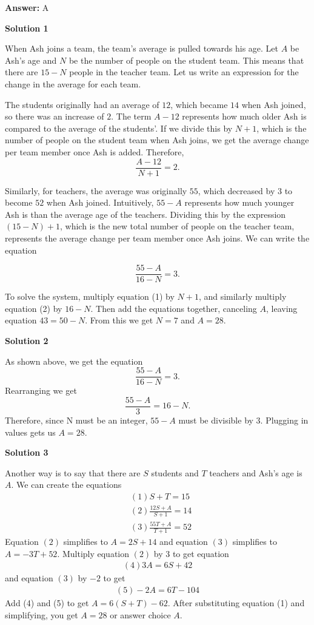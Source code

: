 \begin{enumerate}
 \textbf{Answer: }A



\textbf{Solution 1}

When Ash joins a team, the team's average is pulled towards his age. Let $A$ be Ash's age and $N$ be the number of people on the student team. This means that there are $15-N$ people in the teacher team. Let us write an expression for the change in the average for each team.

 The students originally had an average of $12$, which became $14$ when Ash joined, so there was an increase of $2$. The term $A-12$ represents how much older Ash is compared to the average of the students'. If we divide this by $N+1$, which is the number of people on the student team when Ash joins, we get the average change per team member once Ash is added. Therefore, 
 \[\frac{A-12}{N+1} = 2.\]

 Similarly, for teachers, the average was originally $55$, which decreased by $3$ to become $52$ when Ash joined. Intuitively, $55-A$ represents how much younger Ash is than the average age of the teachers. Dividing this by the expression $(15-N)+1$, which is the new total number of people on the teacher team, represents the average change per team member once Ash joins. We can write the equation

 
 \[\frac{55-A}{16-N} = 3.\]

 To solve the system, multiply equation (1) by $N+1$, and similarly multiply equation (2) by $16-N$. Then add the equations together, canceling $A$, leaving equation $43=50-N$. From this we get $N=7$ and $A= \boxed{28}.$




\textbf{Solution 2}

As shown above, we get the equation 
 \[\frac{55-A}{16-N} = 3.\] Rearranging we get 
 \[\frac{55-A}{3} = 16-N.\] Therefore, since N must be an integer, $55-A$ must be divisible by 3. Plugging in values gets us $A= \boxed{28}.$




\textbf{Solution 3}

Another way is to say that there are $S$ students and $T$ teachers and Ash's age is $A$. We can create the equations\begin{align}&(1) S+T=15 \\&(2) \frac{12S+A}{S+1}=14 \\ &(3) \frac{55T+A}{T+1}=52\end{align}Equation $(2)$ simplifies to $A=2S+14$ and equation $(3)$ simplifies to $A=-3T+52$. Multiply equation $(2)$ by $3$ to get equation \begin{align} (4) 3A=6S+42 \end{align} and equation $(3)$ by $-2$ to get \begin{align}(5) -2A=6T-104 \end{align} Add (4) and (5) to get $A=6(S+T)-62$. After substituting equation (1) and simplifying, you get $A=\boxed{28}$ or answer choice $\boxed{A}$.


\end{enumerate}
